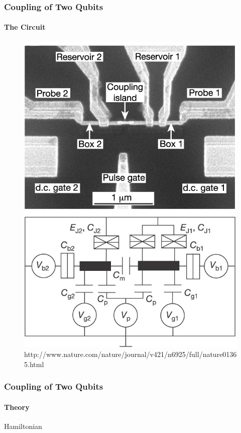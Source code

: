 \documentclass{beamer}
\begin{document}
\begin{frame}
    \frametitle{Coupling of Two Qubits}
    \framesubtitle{The Circuit}
    \begin{figure}[ht!]
        \centering
        \includegraphics[height=0.7\textheight]{img/circuit-sem-and-diagram.jpg}
        \caption{http://www.nature.com/nature/journal/v421/n6925/full/nature01365.html}
    \end{figure}
\end{frame}


\begin{frame}
    \frametitle{Coupling of Two Qubits}
    \framesubtitle{Theory}
    \begin{block}{Hamiltonian}
    \end{block}
\end{frame}
\end{document}
